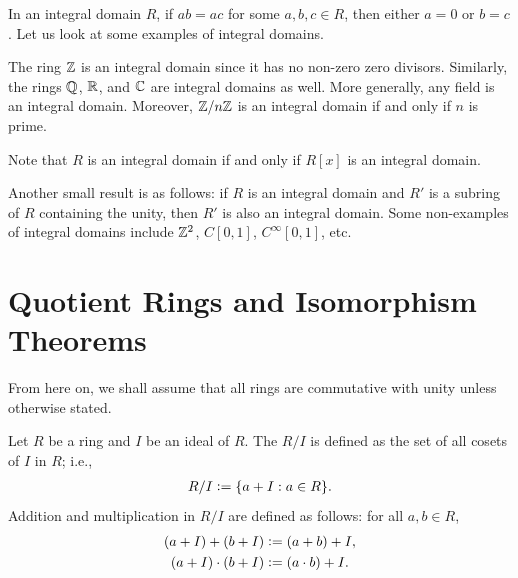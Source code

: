 In an integral domain $R$, if $ab = ac$ for some $a, b, c \in R$, then either $a = 0$ or $b = c$. Let us look at some examples of integral domains.

\begin{example}
    The ring $\mathbb{Z}$ is an integral domain since it has no non-zero zero divisors. Similarly, the rings $\mathbb{Q}$, $\mathbb{R}$, and $\mathbb{C}$ are integral domains as well. More generally, any field is an integral domain. Moreover, $\mathbb{Z}/n\mathbb{Z}$ is an integral domain if and only if $n$ is prime.
\end{example}

\begin{example}
    Note that $R$ is an integral domain if and only if $R[x]$ is an integral domain. 
\end{example}

Another small result is as follows: if $R$ is an integral domain and $R'$ is a subring of $R$ containing the unity, then $R'$ is also an integral domain. Some non-examples of integral domains include $\mathbb{Z}^{2}$, $C[0,1]$, $C^{\infty}[0,1]$, etc.



\section{Quotient Rings and Isomorphism Theorems}

From here on, we shall assume that all rings are commutative with unity unless otherwise stated.

\begin{definition}
    Let $R$ be a ring and $I$ be an ideal of $R$. The  $R/I$ is defined as the set of all cosets of $I$ in $R$; i.e.,
    \begin{align}
        R/I \vcentcolon= \{a + I : a \in R\}.
    \end{align}
    Addition and multiplication in $R/I$ are defined as follows: for all $a, b \in R$,
    \begin{align}
        (a + I) + (b + I) &\vcentcolon= (a + b) + I, \\
        (a + I) \cdot (b + I) &\vcentcolon= (a \cdot b) + I.
    \end{align}
\end{definition}

